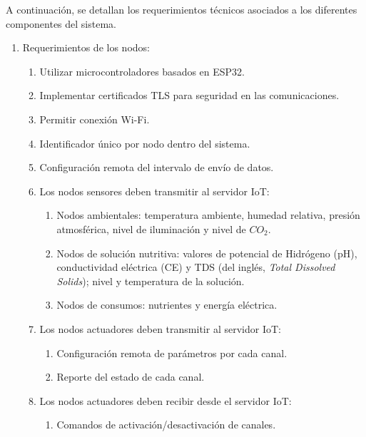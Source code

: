 A continuación, se detallan los requerimientos técnicos asociados a los
diferentes componentes del sistema.

\begin{enumerate}
      \item Requerimientos de los nodos:
            \begin{enumerate}
                  \item Utilizar microcontroladores basados en ESP32.
                  \item Implementar certificados TLS para seguridad en las comunicaciones.
                  \item Permitir conexión Wi-Fi.
                  \item Identificador único por nodo dentro del sistema.
                  \item Configuración remota del intervalo de envío de datos.
                  \item Los nodos sensores deben transmitir al servidor IoT:
                        \begin{enumerate}
                              \item Nodos ambientales: temperatura ambiente, humedad relativa, presión atmosférica,
                                    nivel de iluminación y nivel de $CO_2$.
                              \item Nodos de solución nutritiva: valores de potencial de Hidrógeno (pH),
                                    conductividad eléctrica (CE) y TDS (del inglés, \textit{Total Dissolved
                                          Solids}); nivel y temperatura de la solución.
                              \item Nodos de consumos: nutrientes y energía eléctrica.
                        \end{enumerate}
                  \item Los nodos actuadores deben transmitir al servidor IoT:
                        \begin{enumerate}
                              \item Configuración remota de parámetros por cada canal.
                              \item Reporte del estado de cada canal.
                        \end{enumerate}
                  \item Los nodos actuadores deben recibir desde el servidor IoT:
                        \begin{enumerate}
                              \item Comandos de activación/desactivación de canales.
                        \end{enumerate}
            \end{enumerate}


\end{enumerate}

